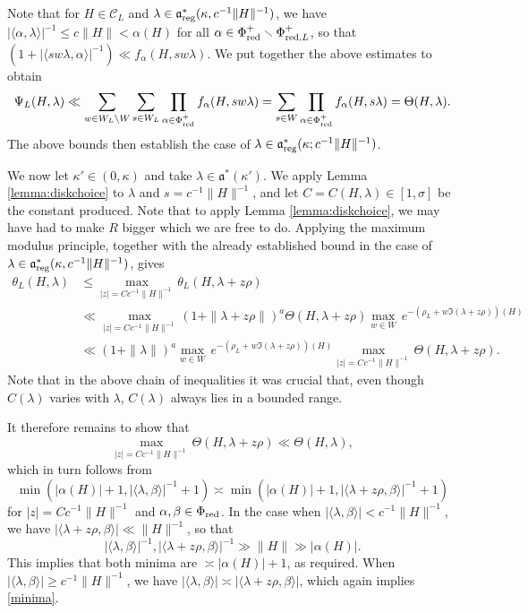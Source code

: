 \documentclass[12pt]{amsart}
\theoremstyle{remark}
\newcommand{\be}{\begin{equation}}
\newcommand{\ee}{\end{equation}}
\begin{document}
Note that for $H\in\mathcal{C}_L$ and $\lambda\in\mathfrak{a}_{\rm reg}^*(\kappa, c^{-1} \|H\|^{-1})$, we have $|\langle \alpha,\lambda\rangle|^{-1} \leq c\|H\| < \alpha(H)$ for all $\alpha \in \Phi_{\textnormal{red}}^+\smallsetminus\Phi_{\textnormal{red},L}^+$, so that
$(1+|\langle sw\lambda, \alpha\rangle|^{-1})\ll f_\alpha(H,sw\lambda)$. We put together the above estimates to obtain
\[
\Psi_L(H,\lambda)\ll\sum_{w\in W_L\backslash W}\sum_{s\in W_L}\prod_{\alpha\in\Phi_{\textnormal{red}}^+}f_\alpha(H,sw\lambda)=\sum_{s\in W}\prod_{\alpha\in\Phi_{\textnormal{red}}^+}f_\alpha(H,s\lambda)
=\Theta(H,\lambda).
\]
The above bounds then establish the case of $\lambda\in\mathfrak{a}_{\rm reg}^*(\kappa; c^{-1} \|H\|^{-1})$.

We now let $\kappa'\in (0,\kappa)$ and take $\lambda \in \mathfrak{a}^* (\kappa')$.  We apply Lemma \ref{lemma:diskchoice} to $\lambda$ and $s = c^{-1} \| H \|^{-1}$, and let $C = C(H,\lambda) \in [1, \sigma]$ be the constant produced. Note that to apply Lemma \ref{lemma:diskchoice}, we may have had to make $R$ bigger which we are free to do. Applying the maximum modulus principle, together with the already established bound in the case of $\lambda \in \mathfrak{a}_{\rm reg}^* (\kappa,c^{-1}\|H\|^{-1})$, gives
\begin{align*}
\theta_L(H, \lambda) & \le \underset{ |z| = C c^{-1} \| H \|^{-1}}{\max} \theta_L(H, \lambda + z \rho) \\
& \ll \underset{ |z| = C c^{-1} \| H \|^{-1}}{\max} (1 + \| \lambda + z \rho \|)^a \Theta(H, \lambda + z \rho) \underset{w \in W}{\max} \, e^{-(\rho_L + w \Im (\lambda + z\rho))(H)} \\
& \ll (1 + \| \lambda \|)^a \underset{w \in W}{\max} \, e^{-(\rho_L + w \Im (\lambda + z\rho))(H)} \underset{ |z| = C c^{-1} \| H \|^{-1}}{\max} \Theta(H, \lambda + z \rho).
\end{align*}
%
Note that in the above chain of inequalities it was crucial that, even though $C(\lambda)$ varies with $\lambda$, $C(\lambda)$ always lies in a bounded range. 

It therefore remains to show that
\[
\underset{ |z| = C c^{-1} \| H \|^{-1}}{\max} \Theta(H, \lambda + z \rho) \ll \Theta(H, \lambda),
\]
which in turn follows from
\be
\label{minima}
\min( |\alpha(H)| +1, | \langle \lambda, \beta \rangle |^{-1} +1) \asymp \min( |\alpha(H)| +1, | \langle \lambda + z\rho, \beta \rangle |^{-1} +1)
\ee
for $|z| = C c^{-1} \| H \|^{-1}$ and $\alpha, \beta \in \Phi_{\textnormal{red}}$. In the case when $| \langle \lambda, \beta \rangle | < c^{-1} \| H \|^{-1}$, we have $| \langle \lambda + z\rho, \beta \rangle | \ll \| H \|^{-1}$, so that
\[
| \langle \lambda, \beta \rangle |^{-1}, | \langle \lambda + z\rho, \beta \rangle |^{-1} \gg \| H \| \gg |\alpha(H)|.
\]
This implies that both minima are $\asymp |\alpha(H)| + 1$, as required.  When $| \langle \lambda, \beta \rangle | \ge c^{-1} \| H \|^{-1}$, we have $| \langle \lambda, \beta \rangle | \asymp | \langle \lambda + z\rho, \beta \rangle |$, which again implies \eqref{minima}.
\end{document}
